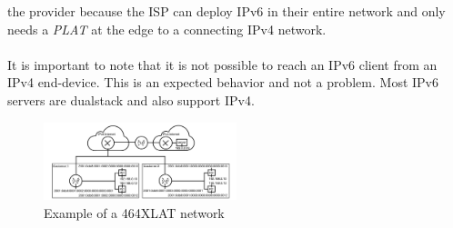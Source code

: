\documentclass[format=sigconf, natbib=true, nonacm=true]{acmart}
\begin{document}
the provider because the ISP can deploy IPv6 in their entire network and only needs a \textit{PLAT} at the edge to a connecting IPv4 network.\\\\It is important to note that it is not possible to reach an IPv6 client from an IPv4 end-device. This is an expected behavior and not a problem. Most IPv6 servers are dualstack and also support IPv4.
    \begin{figure}
        \centering
        \includegraphics[width=0.5\textwidth]{images/464_xlat.png}
        \caption{Example of a 464XLAT network}
        \label{fig:646_XLAT}
    \end{figure}
\end{document}
